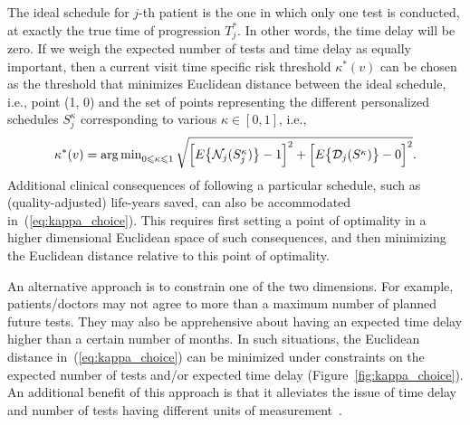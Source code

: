 The ideal schedule for $j$-th patient is the one in which only one test is conducted, at exactly the true time of progression $T^*_j$. In other words, the time delay will be zero. If we weigh the expected number of tests and time delay as equally important, then a current visit time specific risk threshold $\kappa^*(v)$ can be chosen as the threshold that minimizes Euclidean distance between the ideal schedule, i.e., point (1, 0) and the set of points representing the different personalized schedules $S^{\kappa}_j$ corresponding to various $\kappa \in [0, 1]$, i.e.,
\begin{equation}
\label{eq:kappa_choice}
\kappa^*(v) = \argmin_{0 \leq \kappa \leq 1} \sqrt{\Big[E\big\{\mathcal N_j(S^\kappa_j)\big\} - 1\Big]^2 + \Big[E\big\{\mathcal D_j(S^\kappa )\big\} - 0\Big]^2}.
\end{equation}
Additional clinical consequences of following a particular schedule, such as (quality-adjusted) life-years saved, can also be accommodated in~(\ref{eq:kappa_choice}). This requires first setting a point of optimality in a higher dimensional Euclidean space of such consequences, and then minimizing the Euclidean distance relative to this point of optimality.

An alternative approach is to constrain one of the two dimensions. For example, patients/doctors may not agree to more than a maximum number of planned future tests. They may also be apprehensive about having an expected time delay higher than a certain number of months. In such situations, the Euclidean distance in~(\ref{eq:kappa_choice}) can be minimized under constraints on the expected number of tests and/or expected time delay (Figure~\ref{fig:kappa_choice}). An additional benefit of this approach is that it alleviates the issue of time delay and number of tests having different units of measurement~\cite{cook1994equivalence}.


